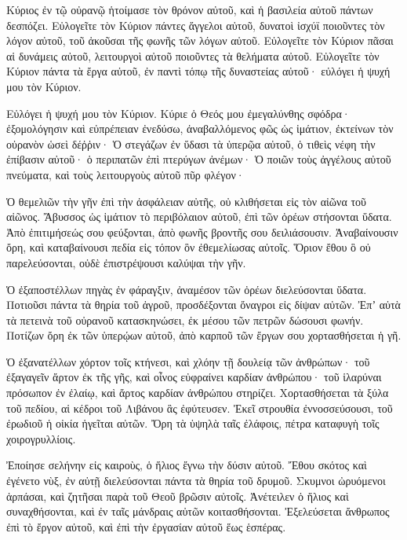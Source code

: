 \begin{spacing}{1.1}
\begin{multicols}{2}
Κύριος ἐν τῷ οὐρανῷ ἡτοίμασε τὸν θρόνον αὐτοῦ, καὶ ἡ βασιλεία αὐτοῦ πάντων δεσπόζει.
Εὐλογεῖτε τὸν Κύριον πάντες ἄγγελοι αὐτοῦ, δυνατοὶ ἰσχύϊ ποιοῦντες τὸν λόγον αὐτοῦ, τοῦ ἀκοῦσαι τῆς φωνῆς τῶν λόγων αὐτοῦ.
Εὐλογεῖτε τὸν Κύριον πᾶσαι αἱ δυνάμεις αὐτοῦ, λειτουργοὶ αὐτοῦ ποιοῦντες τὰ θελήματα αὐτοῦ.
Εὐλογεῖτε τὸν Κύριον πάντα τὰ ἔργα αὐτοῦ, ἐν παντὶ τόπῳ τῆς δυναστείας αὐτοῦ· εὐλόγει ἡ ψυχή μου τὸν Κύριον.

Εὐλόγει ἡ ψυχή μου τὸν Κύριον. Κύριε ὁ Θεός μου ἐμεγαλύνθης σφόδρα· ἐξομολόγησιν καὶ εὐπρέπειαν ἐνεδύσω,
ἀναβαλλόμενος φῶς ὡς ἱμάτιον, ἐκτείνων τὸν οὐρανὸν ὡσεὶ δέῤῥιν·
Ὁ στεγάζων ἐν ὕδασι τὰ ὑπερῷα αὐτοῦ, ὁ τιθεὶς νέφη τὴν ἐπίβασιν αὐτοῦ· ὁ περιπατῶν ἐπὶ πτερύγων ἀνέμων·
Ὁ ποιῶν τοὺς ἀγγέλους αὐτοῦ πνεύματα, καὶ τοὺς λειτουργοὺς αὐτοῦ πῦρ φλέγον·

Ὁ θεμελιῶν τὴν γῆν ἐπὶ τὴν ἀσφάλειαν αὐτῆς, οὐ κλιθήσεται εἰς τὸν αἰῶνα τοῦ αἰῶνος.
Ἄβυσσος ὡς ἱμάτιον τὸ περιβόλαιον αὐτοῦ, ἐπὶ τῶν ὀρέων στήσονται ὕδατα.
Ἀπὸ ἐπιτιμήσεώς σου φεύξονται, ἀπὸ φωνῆς βροντῆς σου δειλιάσουσιν.
Ἀναβαίνουσιν ὄρη, καὶ καταβαίνουσι πεδία εἰς τόπον ὃν ἐθεμελίωσας αὐτοῖς.
Ὅριον ἔθου ὃ οὐ παρελεύσονται, οὐδὲ ἐπιστρέψουσι καλύψαι τὴν γῆν.

Ὁ ἐξαποστέλλων πηγὰς ἐν φάραγξιν, ἀναμέσον τῶν ὀρέων διελεύσονται ὕδατα.
Ποτιοῦσι πάντα τὰ θηρία τοῦ ἀγροῦ, προσδέξονται ὄναγροι εἰς δίψαν αὐτῶν.
Ἐπʼ αὐτὰ τὰ πετεινὰ τοῦ οὐρανοῦ κατασκηνώσει, ἐκ μέσου τῶν πετρῶν δώσουσι φωνήν.
Ποτίζων ὄρη ἐκ τῶν ὑπερῴων αὐτοῦ, ἀπὸ καρποῦ τῶν ἔργων σου χορτασθήσεται ἡ γῆ.

Ὁ ἐξανατέλλων χόρτον τοῖς κτήνεσι, καὶ χλόην τῇ δουλείᾳ τῶν ἀνθρώπων· τοῦ ἐξαγαγεῖν ἄρτον ἐκ τῆς γῆς,
καὶ οἶνος εὐφραίνει καρδίαν ἀνθρώπου· τοῦ ἱλαρύναι πρόσωπον ἐν ἐλαίῳ, καὶ ἄρτος καρδίαν ἀνθρώπου στηρίζει.
Χορτασθήσεται τὰ ξύλα τοῦ πεδίου, αἱ κέδροι τοῦ Λιβάνου ἃς ἐφύτευσεν.
Ἐκεῖ στρουθία ἐννοσσεύσουσι, τοῦ ἐρωδιοῦ ἡ οἰκία ἡγεῖται αὐτῶν.
Ὄρη τὰ ὑψηλὰ ταῖς ἐλάφοις, πέτρα καταφυγὴ τοῖς χοιρογρυλλίοις.

Ἐποίησε σελήνην εἰς καιροὺς, ὁ ἥλιος ἔγνω τὴν δύσιν αὐτοῦ.
Ἔθου σκότος καὶ ἐγένετο νὺξ, ἐν αὐτῇ διελεύσονται πάντα τὰ θηρία τοῦ δρυμοῦ.
Σκυμνοι ὠρυόμενοι ἁρπάσαι, καὶ ζητῆσαι παρὰ τοῦ Θεοῦ βρῶσιν αὐτοῖς.
Ἀνέτειλεν ὁ ἥλιος καὶ συναχθήσονται, καὶ ἐν ταῖς μάνδραις αὐτῶν κοιτασθήσονται.
Ἐξελεύσεται ἄνθρωπος ἐπὶ τὸ ἔργον αὐτοῦ, καὶ ἐπὶ τὴν ἐργασίαν αὐτοῦ ἕως ἑσπέρας.


\end{multicols}
\end{spacing}
